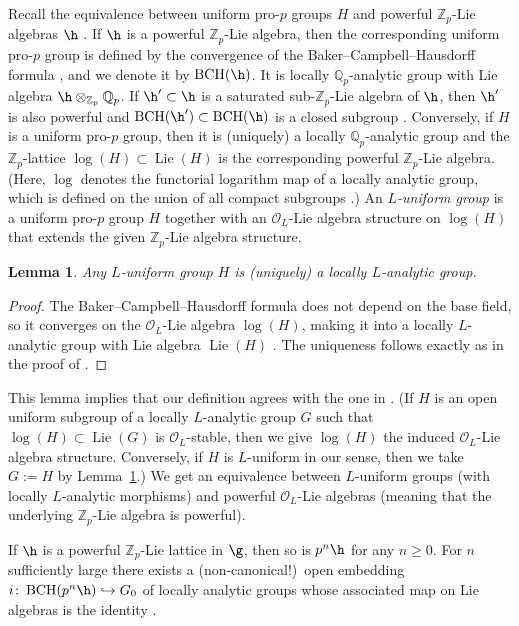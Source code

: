 \documentclass[a4paper]{amsart}
\numberwithin{equation}{section}
\newtheorem{lem}[thm]{Lemma}
\theoremstyle{remark}
\theoremstyle{definition}
\DeclareMathOperator{\Lie}{Lie}
\newcommand{\Z}{\mathbb{Z}}
\newcommand{\Q}{\mathbb{Q}}
\DeclareMathOperator{\BCH}{BCH}
\newcommand{\into}{\hookrightarrow}
\begin{document}
Recall the equivalence between uniform pro-$p$ groups $H$ and powerful $\Z_p$-Lie algebras $\h$ \cite[Theorem 9.10]{DDMS}.
If $\h$ is a powerful $\Z_p$-Lie algebra, then the corresponding uniform pro-$p$ group is defined by the convergence of the Baker--Campbell--Hausdorff formula \cite[Theorem 9.8]{DDMS}, and we denote it by $\BCH(\h)$.
It is locally $\Q_p$-analytic group with Lie algebra $\h \otimes_{\Z_p} \Q_p$.
If $\h' \subset \h$ is a saturated sub-$\Z_p$-Lie algebra of $\h$, then $\h'$ is also powerful and $\BCH(\h') \subset \BCH(\h)$ is a closed subgroup \cite[Scholium to Theorem 9.10]{DDMS}.
Conversely, if $H$ is a uniform pro-$p$ group, then it is (uniquely) a locally $\Q_p$-analytic group and the $\Z_p$-lattice $\log(H) \subset \Lie(H)$ is the corresponding powerful $\Z_p$-Lie algebra.
(Here, $\log$ denotes the functorial logarithm map of a locally analytic group, which is defined on the union of all compact subgroups \cite[III.7.6]{MR0573068}.)
An \emph{$L$-uniform group} is a uniform pro-$p$ group $H$ together with an $\mathcal O_L$-Lie algebra structure on $\log(H)$ that extends the given $\Z_p$-Lie algebra structure.

\begin{lem}\label{lem:L-uniform}
  Any $L$-uniform group $H$ is (uniquely) a locally $L$-analytic group.
\end{lem}

\begin{proof}
  The Baker--Campbell--Hausdorff formula does not depend on the base field, so it converges on the $\mathcal O_L$-Lie algebra $\log(H)$, making it into a locally $L$-analytic group with Lie algebra $\Lie(H)$ \cite[\S17]{MR2810332}.
  The uniqueness follows exactly as in the proof of \cite[Theorem 29.8]{MR2810332}.
\end{proof}

This lemma implies that our definition agrees with the one in \cite[Remark 2.2.5]{OS}.
(If $H$ is an open uniform subgroup of a locally $L$-analytic group $G$ such that $\log(H) \subset \Lie(G)$ is $\mathcal O_L$-stable, then we give $\log(H)$ the induced $\mathcal O_L$-Lie algebra structure.
Conversely, if $H$ is $L$-uniform in our sense, then we take $G := H$ by Lemma~\ref{lem:L-uniform}.)
We get an equivalence between $L$-uniform groups (with locally $L$-analytic morphisms) and powerful $\mathcal O_L$-Lie algebras (meaning that the underlying $\Z_p$-Lie algebra is powerful).

If $\h$ is a powerful $\Z_p$-Lie lattice in $\g$, then so is $p^n\h$ for any $n \ge 0$.
For $n$ sufficiently large there exists a (non-canonical!)\ open embedding $i \colon \BCH(p^n\h) \into G_0$ of locally analytic groups whose associated map on Lie algebras is the identity \cite[Proposition 18.17]{MR2810332}.
\end{document}
